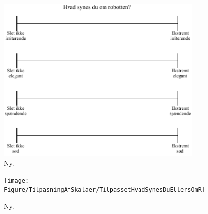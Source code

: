%
\begin{figure}[H]
\centering
\includegraphics[width = 0.9\textwidth]{Figure/TilpasningAfSkalaer/TilpassetHvadSynesDuOmR} 
\caption{Ny.}
\label{fig:TilpassetHvadSynesDuOmR}
\end{figure}
\noindent
%

%
\begin{figure}[H]
\centering
\texttt{[image: Figure/TilpasningAfSkalaer/TilpassetHvadSynesDuEllersOmR]} 
\caption{Ny.}
\label{fig:TilpassetHvadSynesDuEllersOmR}
\end{figure}
\noindent
%
 